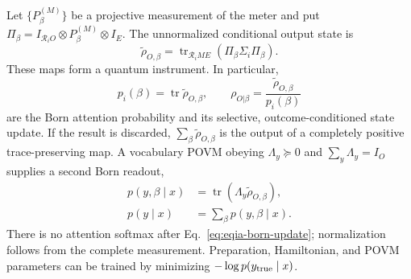 \documentclass[
  aps,
  reprint,
  superscriptaddress,
  floatfix,
  nofootinbib,
  longbibliography
]{revtex4-2}
\begin{document}
Let $\{P_\beta^{(M)}\}$ be a projective measurement of the meter and put
$\Pi_\beta=I_{\mathcal R_iO}\otimes P_\beta^{(M)}\otimes I_E$.  The
unnormalized conditional output state is
\begin{equation}
 \widetilde\rho_{O,\beta}
 =\operatorname{tr}_{\mathcal R_iME}
 \left(\Pi_\beta\Sigma_i\Pi_\beta\right).
\label{eq:eqia-instrument}
\end{equation}
These maps form a quantum instrument.  In particular,
\begin{equation}
 p_i(\beta)=\operatorname{tr}\widetilde\rho_{O,\beta},
 \qquad
 \rho_{O|\beta}
 =\frac{\widetilde\rho_{O,\beta}}{p_i(\beta)}
\label{eq:eqia-born-update}
\end{equation}
are the Born attention probability and its selective, outcome-conditioned
state update.  If the result is discarded, $\sum_\beta
\widetilde\rho_{O,\beta}$ is the output of a completely positive
trace-preserving map.  A vocabulary POVM obeying
$\Lambda_y\succeq0$ and $\sum_y\Lambda_y=I_O$ supplies a second Born readout,
\begin{equation}
\begin{aligned}
 p(y,\beta\mid x)
 &=\operatorname{tr}
   \left(\Lambda_y\widetilde\rho_{O,\beta}\right),\\
 p(y\mid x)&=\sum_\beta p(y,\beta\mid x).
\end{aligned}
\label{eq:eqia-vocabulary}
\end{equation}
There is no attention softmax after Eq.~\eqref{eq:eqia-born-update};
normalization follows from the complete measurement.  Preparation,
Hamiltonian, and POVM parameters can be trained by minimizing
$-\log p(y_{\rm true}\mid x)$.
\end{document}
